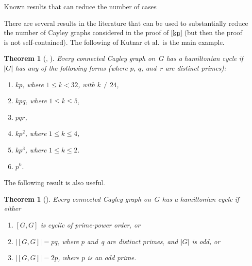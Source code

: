 \documentclass[]{amcjoucc}
\makeatletter
\theoremstyle{plain}
\newtheorem{thm}[equation]{Theorem}
\theoremstyle{definition}
\theoremstyle{definition}
\renewcommand{\section}{%
\@startsection{section}{1}{0pt}{-\baselineskip}{0.5\baselineskip}{\large\bfseries}%
}
\makeatother
\begin{document}
\section{Known results that can reduce the number of cases} \label{ReduceCases}

There are several results in the literature that can be used to substantially reduce the number of Cayley graphs considered in the proof of \cref{kp} (but then the proof is not self-contained). The following  of Kutnar et al.\ is the main example.

\begin{thm}[{}{\cite[Thm.~1.2]{M2Slovenian-LowOrder}, \cite{Witte-PrimePower}}] \label{KutnarEtal}
Every connected Cayley graph on~$G$ has a
hamiltonian cycle if\/ $|G|$ has any of the following forms\/ {\upshape(}where
$p$, $q$, and~$r$ are distinct primes\/{\upshape):}
\begin{multicols}{2}
 \begin{enumerate}
 
 \item \label{KutnarEtal-kp}
  \setcounter{kp}{\theenumi}
 $k p$, where $1 \le k < 32$, with $k \neq 24$, 
 
 \item \label{KutnarEtal-kpq}
  \setcounter{kpq}{\theenumi}
 $k p q$, where $1 \le k \le 5$,
 
 \item \label{KutnarEtal-pqr}
  \setcounter{pqr}{\theenumi}
 $p q r$,
 
 \item \label{KutnarEtal-kp2}
  \setcounter{kpsquared}{\theenumi}
 $k p^2$, where $1 \le k \le 4$, 
 
 \item \label{KutnarEtal-kp3}
  \setcounter{kpcubed}{\theenumi}
 $k p^3$, where $1 \le k \le 2$.
 
\item \label{KutnarEtal-primepower}
 $p^k$.

 \end{enumerate}
 \end{multicols}
 \end{thm}
 
The following result is also useful.
 
 \begin{thm}[\cite{KeatingWitte,Morris-G'=pqOdd,Morris-G'=2p}] \label{G'=pq}
 Every connected Cayley graph on~$G$ has a hamiltonian cycle if either
 	\begin{enumerate}
	\item \label{G'=pq-primepower}
	$[G,G]$ is cyclic of prime-power order, 
	or
	\item $|[G,G]| = pq$, where $p$ and~$q$ are distinct primes, and $|G|$ is odd,
	or
	\item $|[G,G]| = 2p$, where $p$ is an odd prime.
	\end{enumerate}
\end{thm}
\end{document}
